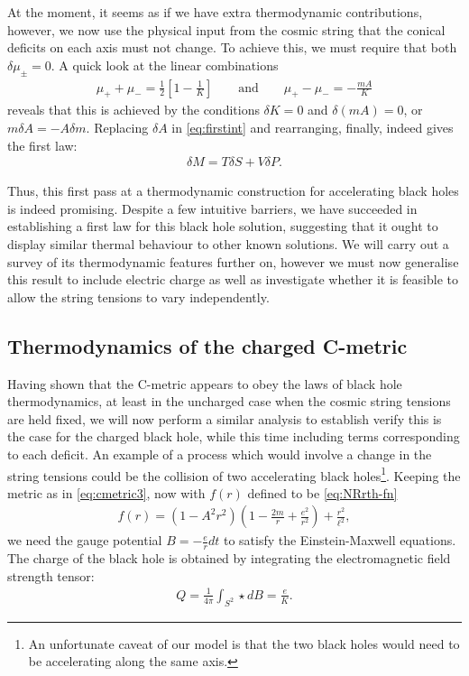\documentclass[
twoside,
openright,
frontopenright,
]{dmathesis}
\begin{document}
At the moment, it seems as if we have extra thermodynamic contributions, however,
we now use the physical input from the cosmic string that the conical deficits
on each axis must not change. To achieve this, we must require that both $\delta
\mu_\pm = 0$. A quick look at the linear combinations
\begin{align}
  \mu_+ + \mu_- = \frac12\left[1-\frac{1}{K}\right] \qquad \mbox{and} \qquad \mu_+-\mu_- = -\frac{mA}{K}
\end{align}
reveals that this is achieved by the conditions $\delta K=0$ and
$\delta (mA) = 0$, or $m\delta A = - A \delta m$.  Replacing $\delta A$ in
\cref{eq:firstint} and rearranging, finally, indeed gives the first law:
\begin{align}
\delta M = T \delta S + V \delta P.
\label{eq:firstlawFT}
\end{align}

Thus, this first pass at a thermodynamic construction for accelerating black
holes is indeed promising. Despite a few intuitive barriers, we have succeeded
in establishing a first law for this black hole solution, suggesting that it
ought to display similar thermal behaviour to other known solutions. We will
carry out a survey of its thermodynamic features further on, however we must now
generalise this result to include electric charge as well as investigate whether
it is feasible to allow the string tensions to vary independently.

\subsection{Thermodynamics of the charged C-metric}
\label{sec:cmet-TD-der}

Having shown that the C-metric appears to obey the laws of black hole
thermodynamics, at least in the uncharged case when the cosmic string tensions
are held fixed, we will now perform a similar analysis to establish verify this
is the case for the charged black hole, while this time including terms
corresponding to each deficit. An example of a process which would involve a
change in the string tensions could be the collision of two accelerating black
holes\footnote{An unfortunate caveat of our model is that the two black holes
  would need to be accelerating along the same axis.}. Keeping the metric as in
\cref{eq:cmetric3}, now with $f(r)$ defined to be \eqref{eq:NRrth-fn}
\begin{align}
  f(r) = (1-A^2r^2)\left(1-\frac{2m}{r} + \frac{e^2}{r^2}\right)+\frac{r^2}{\ell^2},
\end{align}
we need the gauge potential $B = -\frac{e}{r}dt$ to satisfy the Einstein-Maxwell
equations. The charge of the black hole is obtained by integrating the
electromagnetic field strength tensor:
\begin{align}
\label{eq:Qdef}
Q = \frac{1}{4\pi} \int_{S^2} \star dB = \frac{e}{K}.
\end{align}
\end{document}
